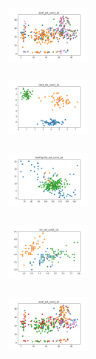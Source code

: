 \begin{figure}[H]
    \begin{subfigure}
        \centering
        \includegraphics[width=0.234\textwidth]{img/am01/ecoli_set_const_10_277451237_clust.png}
    \end{subfigure}
    \hfill
    \begin{subfigure}
        \centering
        \includegraphics[width=0.234\textwidth]{img/am01/rand_set_const_10_277451237_clust.png}
    \end{subfigure}
    \hfill
    \begin{subfigure}
        \centering
        \includegraphics[width=0.234\textwidth]{img/am01/newthyroid_set_const_10_277451237_clust.png}
    \end{subfigure}
    \hfill
    \begin{subfigure}
        \centering
        \includegraphics[width=0.234\textwidth]{img/am01/iris_set_const_10_49258669_clust.png}
    \end{subfigure}
    \hfill
    \begin{subfigure}
        \centering
        \includegraphics[width=0.234\textwidth]{img/am01/ecoli_set_const_10_49258669_clust.png}
    \end{subfigure}
    \hfill
    \begin{subfigure}
        \centering

\end{subfigure}
\end{figure}
